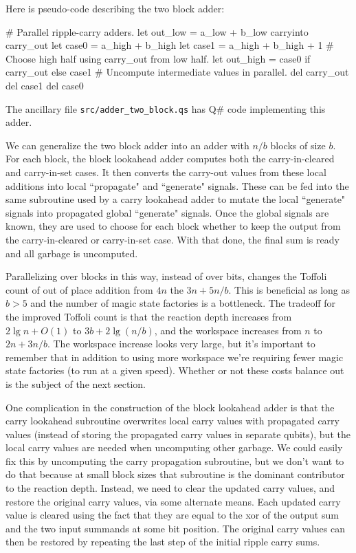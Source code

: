 \documentclass[onecolumn,unpublished]{quantumarticle}
\theoremstyle{definition}
\theoremstyle{definition}
\theoremstyle{definition}
\begin{document}
Here is pseudo-code describing the two block adder:

\begin{python}
    # Parallel ripple-carry adders.
    let out_low = a_low + b_low carryinto carry_out
    let case0 = a_high + b_high
    let case1 = a_high + b_high + 1
    # Choose high half using carry_out from low half.
    let out_high = case0 if carry_out else case1
    # Uncompute intermediate values in parallel.
    del carry_out
    del case1
    del case0
\end{python}

The ancillary file \texttt{src/adder\_two\_block.qs} has Q\# code implementing this adder.

We can generalize the two block adder into an adder with $n/b$ blocks of size $b$.
For each block, the block lookahead adder computes both the carry-in-cleared and carry-in-set cases.
It then converts the carry-out values from these local additions into local ``propagate" and ``generate" signals.
These can be fed into the same subroutine used by a carry lookahead adder to mutate the local ``generate" signals into propagated global ``generate" signals.
Once the global signals are known, they are used to choose for each block whether to keep the output from the carry-in-cleared or carry-in-set case.
With that done, the final sum is ready and all garbage is uncomputed.

Parallelizing over blocks in this way, instead of over bits, changes the Toffoli count of out of place addition from $4n$ the $3n + 5n/b$.
This is beneficial as long as $b > 5$ and the number of magic state factories is a bottleneck.
The tradeoff for the improved Toffoli count is that the reaction depth increases from $2 \lg n + O(1)$ to $3 b + 2 \lg(n/b)$, and the workspace increases from $n$ to $2n + 3n/b$.
The workspace increase looks very large, but it's important to remember that in addition to using more workspace we're requiring fewer magic state factories (to run at a given speed).
Whether or not these costs balance out is the subject of the next section.

One complication in the construction of the block lookahead adder is that the carry lookahead subroutine overwrites local carry values with propagated carry values (instead of storing the propagated carry values in separate qubits), but the local carry values are needed when uncomputing other garbage.
We could easily fix this by uncomputing the carry propagation subroutine, but we don't want to do that because at small block sizes that subroutine is the dominant contributor to the reaction depth.
Instead, we need to clear the updated carry values, and restore the original carry values, via some alternate means.
Each updated carry value is cleared using the fact that they are equal to the xor of the output sum and the two input summands at some bit position.
The original carry values can then be restored by repeating the last step of the initial ripple carry sums.
\end{document}
